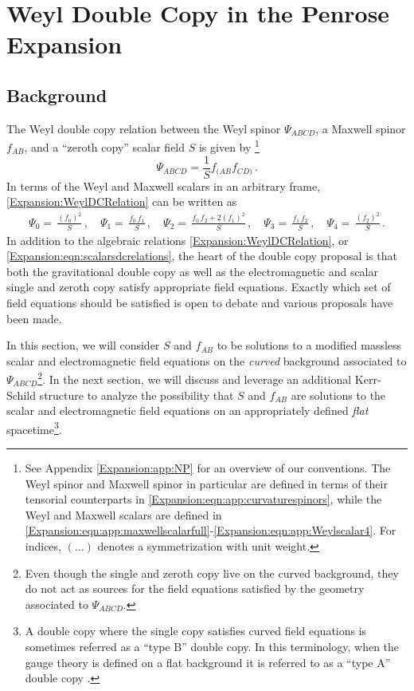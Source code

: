 \section{Weyl Double Copy in the Penrose Expansion} 

\subsection{Background}\label{Expansion:sec:background}
The Weyl double copy relation between the Weyl spinor $\Psi_{ABCD}$, a Maxwell spinor $f_{AB}$, and a ``zeroth copy'' scalar field $S$ is given by \cite{Luna:2018dpt}\footnote{See Appendix \ref{Expansion:app:NP} for an overview of our conventions. The Weyl spinor and Maxwell spinor in particular are defined in terms of their tensorial counterparts in \eqref{Expansion:eqn:app:curvaturespinors}, while the Weyl and Maxwell scalars are defined in \eqref{Expansion:eqn:app:maxwellscalarfull}-\eqref{Expansion:eqn:app:Weylscalar4}. For indices, $(\ldots)$ denotes a symmetrization with unit weight.}
\begin{equation} \label{Expansion:WeylDCRelation} 
\Psi_{ABCD} = \frac{1}{S} f_{(AB} f_{CD)} \, .
\end{equation}
In terms of the Weyl and Maxwell scalars in an arbitrary frame, \eqref{Expansion:WeylDCRelation} can be written as \cite{Godazgar:2021iae}
\begin{equation}\label{Expansion:eqn:scalarsdcrelations}
\begin{aligned}
\Psi_0 = \, \frac{(f_0)^2}{S}\,, \quad
\Psi_1 = \, \frac{f_0\,f_1}{S} \,, \quad
\Psi_2 = \, \frac{f_0\, f_2 + 2 (f_1)^2}{S} \,, \quad
\Psi_3 =  \,\frac{f_1\, f_2}{S} \,, \quad
\Psi_4 = \, \frac{(f_2)^2}{S} \,.
\end{aligned} 
\end{equation}
In addition to the algebraic relations \eqref{Expansion:WeylDCRelation}, or \eqref{Expansion:eqn:scalarsdcrelations}, the heart of the
double copy proposal is that both the gravitational double copy as well as the electromagnetic and scalar single
and zeroth copy satisfy appropriate field equations. Exactly which set of field equations should be satisfied is
open to debate and various proposals have been made.

In this section, we will consider $S$ and $f_{AB}$ to be solutions to a modified massless scalar and
electromagnetic field equations on the \emph{curved} background associated to $\Psi_{ABCD}$\footnote{Even though
the single and zeroth copy live on the curved background, they do not act as sources for the field equations
satisfied by the geometry associated to $\Psi_{ABCD}$.}. In the next section, we will discuss and leverage an
additional Kerr-Schild structure to analyze the possibility that $S$ and $f_{AB}$ are solutions to the scalar and
electromagnetic field equations on an appropriately defined \emph{flat} spacetime\footnote{A double copy where the
single copy satisfies curved field equations is sometimes referred as a ``type B'' double copy. In this
terminology, when the gauge theory is defined on a flat background it is referred to as a ``type A'' double copy
\cite{Bahjat-Abbas:2017htu,White:2024pve}.}.

